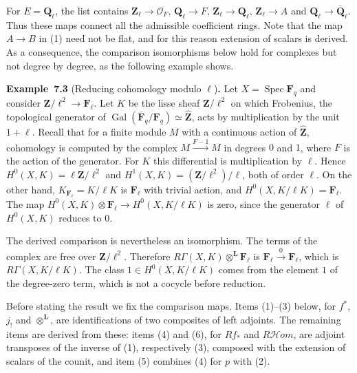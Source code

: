 \documentclass[11pt]{article}
\newenvironment{bpstatement}[2]{\par\addvspace{0.6\baselineskip}\noindent\textbf{#1}#2\textbf{.}\enspace\ignorespaces}
  {\par\addvspace{0.4\baselineskip}}
\providecommand{\cHom}{}\renewcommand{\cHom}{R\mathcal{H}\!om}
\begin{document}
For \(E=\mathbf Q_\ell\), the list contains \(\mathbf Z_\ell\to\mathcal O_F\), \(\mathbf Q_\ell\to F\), \(\mathbf Z_\ell\to\mathbf Q_\ell\), \(\mathbf Z_\ell\to A\) and \(\mathbf Q_\ell\to\overline{\mathbf Q}_\ell\). Thus these maps connect all the admissible coefficient rings. Note that the map \(A\to B\) in (1) need not be flat, and for this reason extension of scalars is derived. As a consequence, the comparison isomorphisms below hold for complexes but not degree by degree, as the following example shows.

\label{bp610}%
\begin{bpstatement}{Example~7.3}{ (Reducing cohomology modulo $\ell$)}
Let \(X=\operatorname{Spec}\mathbf F_q\) and consider \(\mathbf Z/\ell^2\to\mathbf F_\ell\). Let \(K\) be the lisse sheaf \(\mathbf Z/\ell^2\) on which Frobenius, the topological generator of \(\operatorname{Gal}(\overline{\mathbf F}_q/\mathbf F_q)
\simeq\widehat{\mathbf Z}\), acts by multiplication by the unit \(1+\ell\). Recall that for a finite module \(M\) with a continuous action of \(\widehat{\mathbf Z}\), cohomology is computed by the complex \(M\xrightarrow{F-1}M\) in degrees \(0\) and \(1\), where \(F\) is the action of the generator. For \(K\) this differential is multiplication by \(\ell\). Hence \(H^0(X,K)=\ell\mathbf Z/\ell^2\) and \(H^1(X,K)=(\mathbf Z/\ell^2)/\ell\), both of order \(\ell\). On the other hand, \(K_{\mathbf F_\ell}=K/\ell K\) is \(\mathbf F_\ell\) with trivial action, and \(H^0(X,K/\ell K)=\mathbf F_\ell\). The map \(H^0(X,K)\otimes\mathbf F_\ell\to H^0(X,K/\ell K)\) is zero, since the generator \(\ell\) of \(H^0(X,K)\) reduces to \(0\).

The derived comparison is nevertheless an isomorphism. The terms of the complex are free over \(\mathbf Z/\ell^2\). Therefore \(R\Gamma(X,K)\otimes^{\mathbf L}\mathbf F_\ell\) is \(\mathbf F_\ell\xrightarrow{0}\mathbf F_\ell\), which is \(R\Gamma(X,K/\ell K)\). The class \(1\in H^0(X,K/\ell K)\) comes from the element \(1\) of the degree-zero term, which is not a cocycle before reduction.
\end{bpstatement}

\label{bp611}%
Before stating the result we fix the comparison maps. Items (1)–(3) below, for \(f^*\), \(j_!\) and \(\otimes^{\mathbf L}\), are identifications of two composites of left adjoints. The remaining items are derived from these: items (4) and (6), for \(Rf_*\) and \(\cHom\), are adjoint transposes of the inverse of (1), respectively (3), composed with the extension of scalars of the counit, and item (5) combines (4) for \(p\) with (2).
\end{document}
